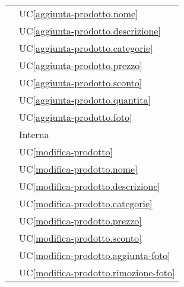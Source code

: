 \begin{longtable}{C{6cm} C{6cm}}
     & UC\ref{aggiunta-prodotto.nome} \\
        
     & UC\ref{aggiunta-prodotto.descrizione} \\
        
     & UC\ref{aggiunta-prodotto.categorie} \\
        
     & UC\ref{aggiunta-prodotto.prezzo} \\
        
     & UC\ref{aggiunta-prodotto.sconto} \\
        
     & UC\ref{aggiunta-prodotto.quantita} \\
        
     & UC\ref{aggiunta-prodotto.foto} \\
        
     & Interna \\
        
     & UC\ref{modifica-prodotto} \\
        
     & UC\ref{modifica-prodotto.nome} \\
        
     & UC\ref{modifica-prodotto.descrizione} \\
        
     & UC\ref{modifica-prodotto.categorie} \\
        
     & UC\ref{modifica-prodotto.prezzo} \\
        
     & UC\ref{modifica-prodotto.sconto} \\
        
     & UC\ref{modifica-prodotto.aggiunta-foto} \\
        
     & UC\ref{modifica-prodotto.rimozione-foto} \\
        

\end{longtable}
